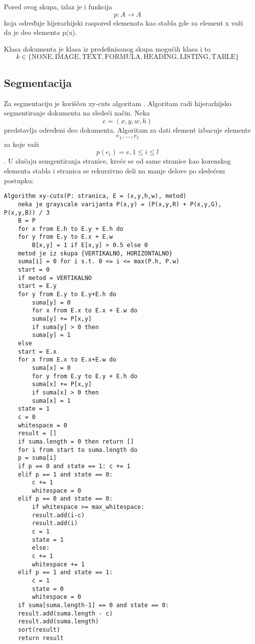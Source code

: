 \documentclass[]{amsart}
\begin{document}
Pored ovog skupa, izlaz je i funkcija $$ p : A \to A $$ koja određuje hijerarhijski raspored elemenata kao stabla gde za element x važi da je
deo elementa p(x). 

Klasa dokumenta je klasa iz predefinisanog skupa mogućih klasa i to $$ k \in \{\text{NONE}, \text{IMAGE}, \text{TEXT}, \text{FORMULA}, \text{HEADING}, \text{LISTING}, \text{TABLE}\} $$ 



\subsection{Segmentacija}
\label{sec:org7eee69b}

Za segmentaciju je koriščen xy-cuts algoritam \cite{ha1995recursive}. Algoritam radi hijerarhijsko segmentiranje dokumenta na sledeći način. Neka $$ e = (x,y,w,h) $$ predstavlja određeni
deo dokumenta. Algoritam za dati element izbacuje elemente $$ e_1, ..., e_l $$ za koje važi $$ p(e_i) = e, 1 \le i \le l $$. U slučaju semgentiranja stranice, kreće se od same stranice kao korenskog elementa
stabla i stranica se rekurzivno deli na manje delove po sledećem postupku:

\begin{verbatim}
Algorithm xy-cuts(P: stranica, E = (x,y,h,w), metod)
    neka je grayscale varijanta P(x,y) = (P(x,y,R) + P(x,y,G), P(x,y,B)) / 3 
    B = P
    for x from E.h to E.y + E.h do
	for y from E.y to E.x + E.w
	    B[x,y] = 1 if E[x,y] > 0.5 else 0 
    metod je iz skupa {VERTIKALNO, HORIZONTALNO}
    suma[i] = 0 for i s.t. 0 <= i <= max(P.h, P.w)
    start = 0 
    if metod = VERTIKALNO
	start = E.y
	for y from E.y to E.y+E.h do
	    suma[y] = 0
	    for x from E.x to E.x + E.w do
		suma[y] += P[x,y]
	    if suma[y] > 0 then
		suma[y] = 1
    else
	start = E.x
	for x from E.x to E.x+E.w do
	    suma[x] = 0
	    for y from E.y to E.y + E.h do
		suma[x] += P[x,y]
	    if suma[x] > 0 then
		suma[x] = 1
    state = 1
    c = 0
    whitespace = 0
    result = []
    if suma.length = 0 then return []
    for i from start to suma.length do
	p = suma[i]
	if p == 0 and state == 1: c += 1 
	elif p == 1 and state == 0: 
	    c += 1
	    whitespace = 0
	elif p == 0 and state == 0: 
	    if whitespace >= max_whitespace:
		result.add(i-c)
		result.add(i)
		c = 1 
		state = 1 
	    else:
		c += 1
		whitespace += 1
	elif p == 1 and state == 1:
	    c = 1 
	    state = 0
	    whitespace = 0
    if suma[suma.length-1] == 0 and state == 0: 
	result.add(suma.length - c)
	result.add(suma.length)
    sort(result)
    return result 
\end{verbatim}
\end{document}
